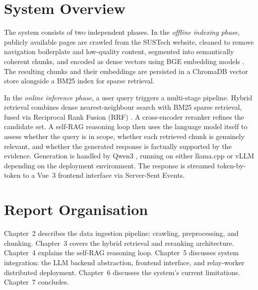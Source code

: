 \section{System Overview}

The system consists of two independent phases. In the \emph{offline indexing phase}, publicly available pages are crawled from the SUSTech website, cleaned to remove navigation boilerplate and low-quality content, segmented into semantically coherent chunks, and encoded as dense vectors using BGE embedding models \parencite{bge2024}. The resulting chunks and their embeddings are persisted in a ChromaDB \parencite{chromadb} vector store alongside a BM25 index for sparse retrieval.

In the \emph{online inference phase}, a user query triggers a multi-stage pipeline. Hybrid retrieval combines dense nearest-neighbour search with BM25 sparse retrieval, fused via Reciprocal Rank Fusion (RRF) \parencite{rrf2009}. A cross-encoder reranker refines the candidate set. A self-RAG reasoning loop \parencite{selfrag2024} then uses the language model itself to assess whether the query is in scope, whether each retrieved chunk is genuinely relevant, and whether the generated response is factually supported by the evidence. Generation is handled by Qwen3 \parencite{qwen2025}, running on either llama.cpp \parencite{llamacpp} or vLLM \parencite{vllm2023} depending on the deployment environment. The response is streamed token-by-token to a Vue~3 frontend interface via Server-Sent Events.

\section{Report Organisation}

Chapter~2 describes the data ingestion pipeline: crawling, preprocessing, and chunking. Chapter~3 covers the hybrid retrieval and reranking architecture. Chapter~4 explains the self-RAG reasoning loop. Chapter~5 discusses system integration: the LLM backend abstraction, frontend interface, and relay-worker distributed deployment. Chapter~6 discusses the system's current limitations. Chapter~7 concludes.
